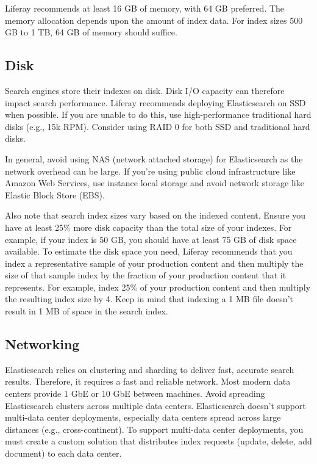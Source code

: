 Liferay recommends at least 16 GB of memory, with 64 GB preferred. The
memory allocation depends upon the amount of index data. For index sizes
500 GB to 1 TB, 64 GB of memory should suffice.

\subsection{Disk}\label{disk}

Search engines store their indexes on disk. Disk I/O capacity can
therefore impact search performance. Liferay recommends deploying
Elasticsearch on SSD when possible. If you are unable to do this, use
high-performance traditional hard disks (e.g., 15k RPM). Consider using
RAID 0 for both SSD and traditional hard disks.

In general, avoid using NAS (network attached storage) for Elasticsearch
as the network overhead can be large. If you're using public cloud
infrastructure like Amazon Web Services, use instance local storage and
avoid network storage like Elastic Block Store (EBS).

Also note that search index sizes vary based on the indexed content.
Ensure you have at least 25\% more disk capacity than the total size of
your indexes. For example, if your index is 50 GB, you should have at
least 75 GB of disk space available. To estimate the disk space you
need, Liferay recommends that you index a representative sample of your
production content and then multiply the size of that sample index by
the fraction of your production content that it represents. For example,
index 25\% of your production content and then multiply the resulting
index size by 4. Keep in mind that indexing a 1 MB file doesn't result
in 1 MB of space in the search index.

\subsection{Networking}\label{networking}

Elasticsearch relies on clustering and sharding to deliver fast,
accurate search results. Therefore, it requires a fast and reliable
network. Most modern data centers provide 1 GbE or 10 GbE between
machines. Avoid spreading Elasticsearch clusters across multiple data
centers. Elasticsearch doesn't support multi-data center deployments,
especially data centers spread across large distances (e.g.,
cross-continent). To support multi-data center deployments, you must
create a custom solution that distributes index requests (update,
delete, add document) to each data center.

